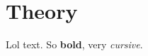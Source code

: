 \documentclass[Main]{subfiles}
\begin{document}
\section{Theory} %
	\label{sec:theory}
	
	Lol text.
	So \textbf{bold}, very \emph{cursive}.
	
	
	
	
	
	
	
\end{document}

